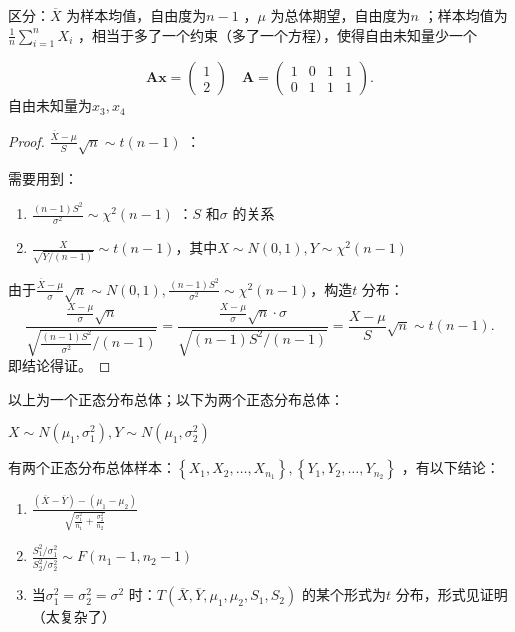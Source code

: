 \begin{notation}
区分：$\overline{X}$ 为样本均值，自由度为$n-1$ ，$\mu$ 为总体期望，自由度为$n$ ；样本均值为$\frac{1}{n}\sum_{i=1}^{n} X_{i}$ ，相当于多了一个约束（多了一个方程），使得自由未知量少一个
\end{notation}
\begin{eg}
\[
    \bm{Ax}=\begin{pmatrix}
        1\\
        2
    \end{pmatrix}\quad \bm{A}=\begin{pmatrix}
    1 & 0 & 1 & 1\\
    0 & 1 & 1 & 1
    \end{pmatrix}
.\]
自由未知量为$x_3,x_4$
\end{eg}
\begin{proof}
    $\frac{\overline{X}-\mu}{S}\sqrt{n}\sim t\left( n-1 \right)$ ：

    需要用到： \begin{enumerate}
        \item $\frac{\left( n-1 \right)S^2 }{\sigma^2 }\sim \chi^2 \left( n-1 \right)$ ：$S$ 和$\sigma$ 的关系
        \item $\frac{X}{\sqrt{Y /\left( n-1 \right)}}\sim t\left( n-1 \right)$，其中$X\sim N\left( 0,1 \right),Y\sim \chi^2 \left( n-1 \right)$
    \end{enumerate}
    由于$\frac{\overline{X}-\mu}{\sigma}\sqrt{n}\sim N\left( 0,1 \right),  \frac{\left( n-1 \right)S^2 }{\sigma^2 }\sim \chi^2 \left( n-1 \right)$，构造$t$ 分布：\[
        \frac{\frac{X-\mu}{\sigma}\sqrt{n}}{\sqrt{\frac{\left( n-1 \right)S^2 }{\sigma^2 } /\left( n-1 \right)}}=\frac{\frac{X-\mu}{\sigma}\sqrt{n}\cdot \sigma}{\sqrt{\left( n-1 \right)S^2 /\left( n-1 \right)}}=\frac{X-\mu}{S}\sqrt{n}\sim t\left( n-1 \right)
    .\]
    即结论得证。
\end{proof}
以上为一个正态分布总体；以下为两个正态分布总体：
\begin{cor}
    $X\sim N\left( \mu_1,\sigma_1^2  \right),Y\sim N\left( \mu_1,\sigma_2^2  \right)$ 

    有两个正态分布总体样本：$\left\{ X_1,X_2,\ldots ,X_{n_1} \right\},\left\{ Y_1,Y_2,\ldots ,Y_{n_2} \right\}$ ，有以下结论：
    \begin{enumerate}
        \item $\frac{\left( \overline{X}-\overline{Y}\right) -\left( \mu_1-\mu_2 \right)}{\sqrt{\frac{\sigma_1^2 }{n_1}+\frac{\sigma_2^2 }{n_2}}}$
        \item $\frac{S_1^2 /\sigma_1^2 }{S_2^2 /\sigma_2^2}\sim F\left( n_1-1,n_2-1 \right)$
        \item 当$\sigma_1^2 =\sigma_2^2 =\sigma^2  $ 时：$T\left( \overline{X},\overline{Y},\mu_1,\mu_2,S_1,S_2 \right)$ 的某个形式为$t$ 分布，形式见证明（太复杂了）
    \end{enumerate}
\end{cor}

